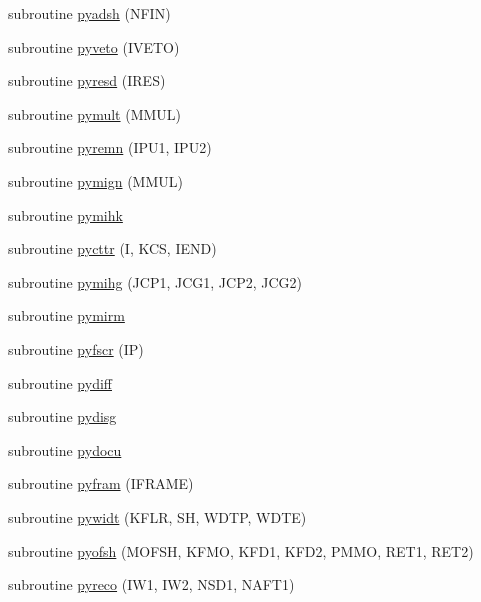 \begin{DoxyCompactItemize}
subroutine \hyperlink{pythia-6_84_824_8f_a3b3cb572da2912af5b37da0f6baa243b}{pyadsh} (N\+F\+I\+N)
\item 
subroutine \hyperlink{pythia-6_84_824_8f_ae9f324419626b48b8aec2ff1f96842b7}{pyveto} (I\+V\+E\+T\+O)
\item 
subroutine \hyperlink{pythia-6_84_824_8f_a420d8af4193fc0229b857f9b5c44017f}{pyresd} (I\+R\+E\+S)
\item 
subroutine \hyperlink{pythia-6_84_824_8f_a4ae1a9148440832c122abdaedf3555a7}{pymult} (M\+M\+U\+L)
\item 
subroutine \hyperlink{pythia-6_84_824_8f_aeb405fd3ad191526318cdddb7dde6f88}{pyremn} (I\+P\+U1, I\+P\+U2)
\item 
subroutine \hyperlink{pythia-6_84_824_8f_a5c7e2372fde451d6f2253ef044e01364}{pymign} (M\+M\+U\+L)
\item 
subroutine \hyperlink{pythia-6_84_824_8f_a380d5a67cf0b2b0e84a5dee74ad5957a}{pymihk}
\item 
subroutine \hyperlink{pythia-6_84_824_8f_a1b5177c55286abfcfa1e7668bdb4bd74}{pycttr} (I, K\+C\+S, I\+E\+N\+D)
\item 
subroutine \hyperlink{pythia-6_84_824_8f_ac8dd442c2f34ca943404bcfbe715776b}{pymihg} (J\+C\+P1, J\+C\+G1, J\+C\+P2, J\+C\+G2)
\item 
subroutine \hyperlink{pythia-6_84_824_8f_af6270eeef12969a7be55ee5423d8f478}{pymirm}
\item 
subroutine \hyperlink{pythia-6_84_824_8f_a53aee4d056754e39818570985bc7167d}{pyfscr} (I\+P)
\item 
subroutine \hyperlink{pythia-6_84_824_8f_a973c4594f689ccebe5ec7cac4d282a3b}{pydiff}
\item 
subroutine \hyperlink{pythia-6_84_824_8f_a0e46fc7fcb0065bf77fceb77b729a30c}{pydisg}
\item 
subroutine \hyperlink{pythia-6_84_824_8f_a9c34dd046b708bae74764d11961b1bf4}{pydocu}
\item 
subroutine \hyperlink{pythia-6_84_824_8f_a1fa4f66dad94f52bee42aa351c5af69e}{pyfram} (I\+F\+R\+A\+M\+E)
\item 
subroutine \hyperlink{pythia-6_84_824_8f_ad7324915c7a7d7f155890fd467a05d8e}{pywidt} (K\+F\+L\+R, S\+H, W\+D\+T\+P, W\+D\+T\+E)
\item 
subroutine \hyperlink{pythia-6_84_824_8f_a7c47045290198780dd664e84fbacf4fc}{pyofsh} (M\+O\+F\+S\+H, K\+F\+M\+O, K\+F\+D1, K\+F\+D2, P\+M\+M\+O, R\+E\+T1, R\+E\+T2)
\item 
subroutine \hyperlink{pythia-6_84_824_8f_a765625392f2be53cb4e630c2114d8e98}{pyreco} (I\+W1, I\+W2, N\+S\+D1, N\+A\+F\+T1)

\end{DoxyCompactItemize}
